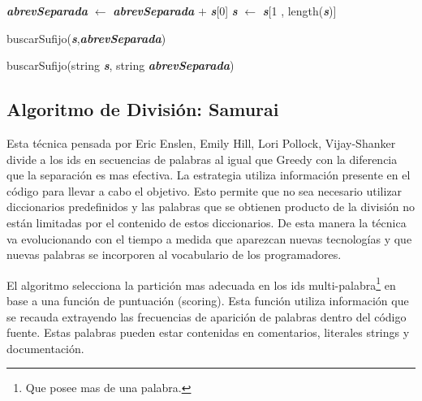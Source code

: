 \documentclass[a4paper,12pt]{report}
\begin{document}
\begin{function}[H]
\LinesNumbered%
\BlankLine
{}
\BlankLine
{}
\BlankLine
{}
\BlankLine
\textit{\textbf{abrevSeparada}} $\leftarrow$ \textit{\textbf{abrevSeparada}} $+$ \textit{\textbf{s}}[0]
\BlankLine
{}
\BlankLine
\textit{\textbf{s}} $\leftarrow$ \textit{\textbf{s}}[1 , length(\textit{\textbf{s}})]

\Return buscarSufijo(\textit{\textbf{s}},\textit{\textbf{abrevSeparada}})

\caption{buscarSufijo(string \textit{\textbf{s}}, string \textit{\textbf{abrevSeparada}})}
\end{function}

\subsection{Algoritmo de División: Samurai}

Esta técnica pensada por Eric Enslen, Emily Hill, Lori Pollock, Vijay-Shanker\cite{EHPV09} divide a los ids en secuencias de palabras al igual que Greedy con la diferencia que la separación es mas efectiva. La estrategia utiliza información presente en el código para llevar a cabo el objetivo. Esto permite que no sea necesario utilizar diccionarios predefinidos y las palabras que se obtienen producto de la división no están limitadas por el contenido de estos diccionarios. De esta manera la técnica va evolucionando con el tiempo a medida que aparezcan nuevas tecnologías y que nuevas palabras se incorporen al vocabulario de los programadores.

El algoritmo selecciona la partición mas adecuada en los ids multi-palabra\footnote[1]{Que posee mas de una palabra.} en base a una función de puntuación (scoring). Esta función utiliza información que se recauda extrayendo las frecuencias de aparición de palabras dentro del código fuente. Estas palabras pueden estar contenidas en comentarios, literales strings y documentación.
\end{document}
